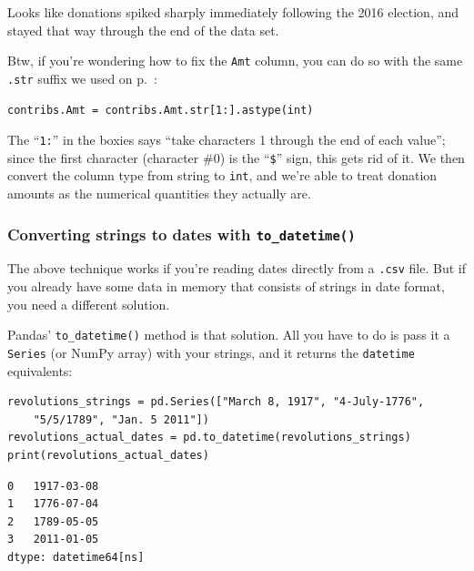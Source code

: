 Looks like donations spiked sharply immediately following the 2016 election,
and stayed that way through the end of the data set.

\bigskip
{}

Btw, if you're wondering how to fix the \texttt{Amt} column, you can do so
with the same \texttt{.str} suffix we used on p.~\pageref{strSuffix}:

\begin{Verbatim}[fontsize=\small,samepage=true,frame=single,framesep=3mm]
contribs.Amt = contribs.Amt.str[1:].astype(int)
\end{Verbatim}

The ``\texttt{1:}'' in the boxies says ``take characters 1 through the end of
each value''; since the first character (character \#0) is the ``\texttt{\$}''
sign, this gets rid of it. We then convert the column type from string to
\texttt{int}, and we're able to treat donation amounts as the numerical
quantities they actually are.


\subsubsection{Converting strings to dates with \texttt{to\_datetime()}}

The above technique works if you're reading dates directly from a \texttt{.csv}
file. But if you already have some data in memory that consists of strings in
date format, you need a different solution.

Pandas' \texttt{to\_datetime()} method is that solution. All you have to do is
pass it a \texttt{Series} (or NumPy array) with your strings, and it returns
the \texttt{datetime} equivalents:

\begin{Verbatim}[fontsize=\footnotesize,samepage=true,frame=single,framesep=3mm]
revolutions_strings = pd.Series(["March 8, 1917", "4-July-1776",
    "5/5/1789", "Jan. 5 2011"])
revolutions_actual_dates = pd.to_datetime(revolutions_strings)
print(revolutions_actual_dates)
\end{Verbatim}
\vspace{-.2in}

\begin{Verbatim}[fontsize=\small,samepage=true,frame=single,framesep=3mm]
0   1917-03-08
1   1776-07-04
2   1789-05-05
3   2011-01-05
dtype: datetime64[ns]
\end{Verbatim}

